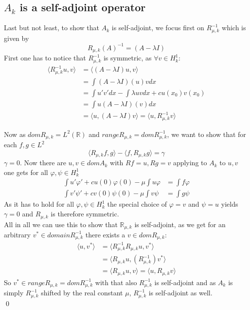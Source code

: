 \documentclass[14pt,a4paper]{scrartcl}
\numberwithin{equation}{section}
\newcommand{\R}{\mathbb{R}}
\begin{document}
\subsection{$A_{k}$ is a self-adjoint operator}
Last but not least, to show that $A_{k}$ is self-adjoint, we focus first on $R_{\mu, k}^{-1}$ which is given by 
	\[ R_{\mu, k}(A)^{-1} = (A - \lambda I) \] 
First one has to notice that $R_{\mu, k}^{-1}$ is symmetric, as $\forall v \in H^{1}_{k}$:
\begin{align*}
	\langle R_{\mu, k}^{-1} u, v \rangle & = \langle (A - \lambda I) u, v \rangle \\
		& = \int (A - \lambda I)(u) v dx \\
		& = \int u'v' dx - \int \lambda u v dx + c u(x_{0}) v(x_{0}) \\
		& = \int u (A - \lambda I)(v) dx \\
		& = \langle u, (A - \lambda I) v \rangle = \langle u,  R_{\mu, k}^{-1} v \rangle 
\end{align*}

Now as $dom R_{\mu, k} = L^{2}(\R)$ and $range R_{\mu, k} = dom R_{\mu, k}^{-1}$, we want to show that for each $f, g \in L^{2}$
\[ \langle R_{\mu, k} f, g \rangle - \langle f, R_{\mu, k} g  \rangle = \gamma \]
$\gamma = 0$. Now there are $u, v \in dom A_{k}$ with $Rf = u, Rg = v$ applying to $A_{k}$ to $u, v$ one gets for all $\varphi, \psi \in H^{1}_{k}$
\begin{align*}
	\int u' \varphi' + c u(0) \varphi(0) - \mu \int u \varphi & = \int f \varphi \\
	\int v' \psi' + c v(0) \psi(0) - \mu \int v \psi & = \int g \psi
\end{align*}
As it has to hold for all $\varphi, \psi \in H^{1}_{k}$ the special choice of $\varphi = v$ and $\psi = u$ yields $\gamma = 0$ and $R_{\mu, k}$ is therefore symmetric. \\
All in all we can use this to show that $\R_{\mu, k}$ is self-adjoint, as we get for an arbitrary $v^{*} \in domain R_{\mu, k}^{-1}$ there exists a $v \in dom R_{\mu, k}$:
\begin{align*}
	\langle u, v^{*} \rangle & = \langle R_{\mu, k}^{-1} R_{\mu, k} u , v^{*} \rangle \\
		& = \langle R_{\mu, k} u, (R_{\mu, k}^{-1}) v^{*} \rangle \\
		& = \langle R_{\mu, k} u, v \rangle  = \langle  u, R_{\mu, k} v \rangle 
\end{align*}
So $v^{*} \in range R_{\mu, k} = dom R_{\mu, k}^{-1}$ with that also $R_{\mu, k}^{-1}$ is self-adjoint and as $A_{k}$ is simply $R_{\mu, k}^{-1}$ shifted by the real constant $\mu$, $R_{\mu, k}^{-1}$ is self-adjoint as well. \\
\hfill \qed
\end{document}
